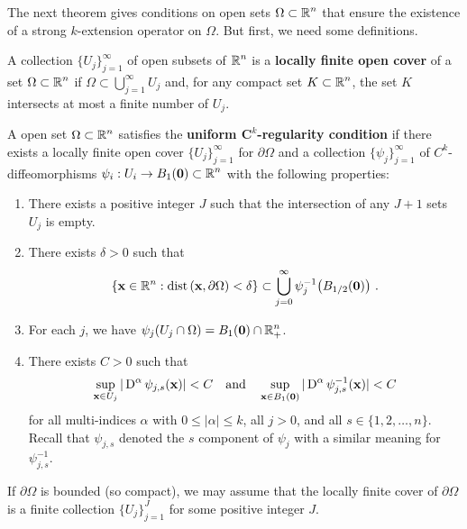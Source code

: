 The next theorem gives conditions on open sets
$\displaystyle \Omega \subset \mathbb{R}^n$
that ensure the existence of a strong $k$-extension operator on $\Omega$.
But first, we need some definitions.

\begin{defn}
A collection $\displaystyle \{ U_j \}_{j=1}^\infty$ of open subsets of
$\displaystyle \mathbb{R}^n$ is a {\bfseries locally finite open cover}%
 of a set
$\displaystyle \Omega \subset \mathbb{R}^n$ if
$\displaystyle \Omega \subset \bigcup_{j=1}^\infty U_j$ and,
for any compact set $\displaystyle K \subset \mathbb{R}^n$, the set $K$
intersects at most a finite number of $U_j$.
\end{defn}

\begin{defn} \label{UnifKregDefn}
A open set $\displaystyle \Omega \subset \mathbb{R}^n$ satisfies the
{\bfseries uniform $\displaystyle \mathbf C^k$-regularity condition}%
 if there exists
a locally finite open cover
$\displaystyle \{ U_j \}_{j=1}^\infty$ for $\partial \Omega$ and a collection 
$\displaystyle \{ \psi_j \}_{j=1}^\infty$ of $\displaystyle C^k$-diffeomorphisms 
$\displaystyle \psi_i: U_i \to B_{1}(\mathbf{0}) \subset \mathbb{R}^n$ with the following
properties:
\begin{enumerate}
\item There exists a positive integer $J$ such that the intersection
of any $J+1$ sets $U_j$ is empty.
\item There exists $\delta >0$ such that
\[
\left\{ \VEC{x} \in \RR^n :
\dist{\VEC{x}}{\partial \Omega}  < \delta \right\}
\subset \bigcup_{j=0}^\infty \psi_j^{-1}\big(B_{1/2}(\VEC{0})\big) \ .
\]
\item For each $j$, we have
$\displaystyle \psi_j(U_j\cap \Omega) = B_{1}(\mathbf{0}) \cap \mathbb{R}^n_+$.
\item There exists $C>0$ such that
\[
\sup_{\mathbf{x}\in U_j} |\operatorname{D}^\alpha\psi_{j,s}(\mathbf{x})| < C
\quad \text{and} \quad
\sup_{\mathbf{x}\in B_{1}(\mathbf{0})} |\operatorname{D}^\alpha\psi^{-1}_{j,s}(\mathbf{x})| < C
\]
for all multi-indices $\alpha$ with $0\leq|\alpha|\leq k$, all
$j > 0$, and all $s \in \{1,2,\ldots, n\}$.  Recall that
$\psi_{j,s}$ denoted the $s$ component of $\psi_j$ with a similar
meaning for $\displaystyle \psi^{-1}_{j,s}$.
\end{enumerate}
If $\partial \Omega$ is bounded (so compact), we may assume that
the locally finite cover of $\partial \Omega$ is a finite collection
$\displaystyle \{ U_j \}_{j=1}^J$ for some positive integer $J$.
\end{defn}

